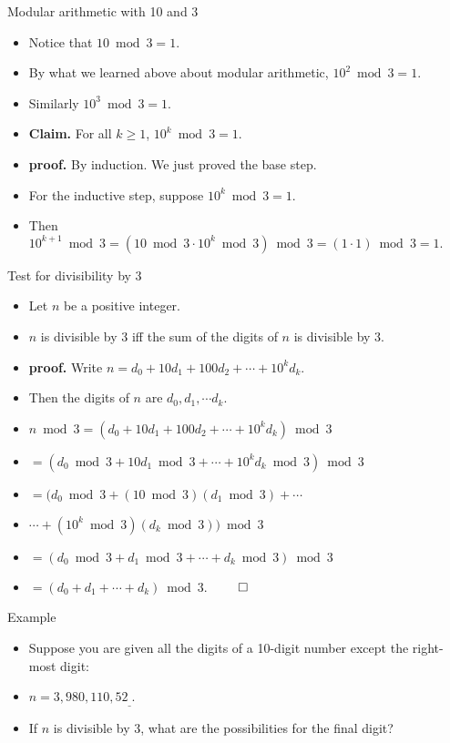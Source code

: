 \documentclass{beamer}
\begin{document}
\begin{frame}{Modular arithmetic with 10 and 3}
\begin{itemize}
  \item Notice that $10 \bmod 3 = 1$.
  \item By what we learned above about modular arithmetic, $10^2 \bmod 3 = 1$.
  \item Similarly $10^3 \bmod 3 = 1$.
  \item \textbf{Claim.} For all $k\geq 1$, $10^k \bmod 3 = 1$.
  \item \textbf{proof.} By induction. We just proved the base step.
  \item For the inductive step, suppose $10^k \bmod 3 = 1$.
  \item Then $10^{k+1}\bmod 3 = \left(10\bmod 3 \cdot 10^k \bmod 3 \right) \bmod 3 = (1\cdot 1) \bmod 3 = 1.$
\end{itemize}
\end{frame}

\begin{frame}{Test for divisibility by 3}
\begin{itemize}
  \item Let $n$ be a positive integer.
  \item $n$ is divisible by 3 iff the sum of the digits of $n$ is divisible by 3.
  \item \textbf{proof.} Write $n=d_0 + 10d_1 + 100 d_2 + \cdots + 10^k d_k$.
  \item Then the digits of $n$ are $d_0,d_1,\cdots d_k$.
  \item $n\bmod 3 = (d_0 + 10d_1 + 100 d_2 + \cdots + 10^k d_k)\bmod 3$
  \item  $=\left(d_0\bmod 3 + 10d_1\bmod 3 + \cdots + 10^k d_k \bmod 3 \right) \bmod 3$
  \item  $=\big(d_0\bmod 3 + (10\bmod 3)(d_1\bmod 3) + \cdots $
  \item  $  \cdots + (10^k\bmod 3) (d_k \bmod 3) \big) \bmod 3$
  \item  $=\left(d_0\bmod 3 + d_1\bmod 3 + \cdots + d_k \bmod 3 \right) \bmod 3$
  \item  $=\left(d_0 + d_1 + \cdots + d_k  \right) \bmod 3$. $\qed$
\end{itemize}
\end{frame}


\begin{frame}{Example}
\begin{itemize}
  \item Suppose you are given all the digits of a 10-digit number except the right-most digit:
  \item $n=3,980,110,52_{\_}$.
  \item If $n$ is divisible by 3, what are the possibilities for the final digit?
\end{itemize}
\end{frame}
\end{document}

